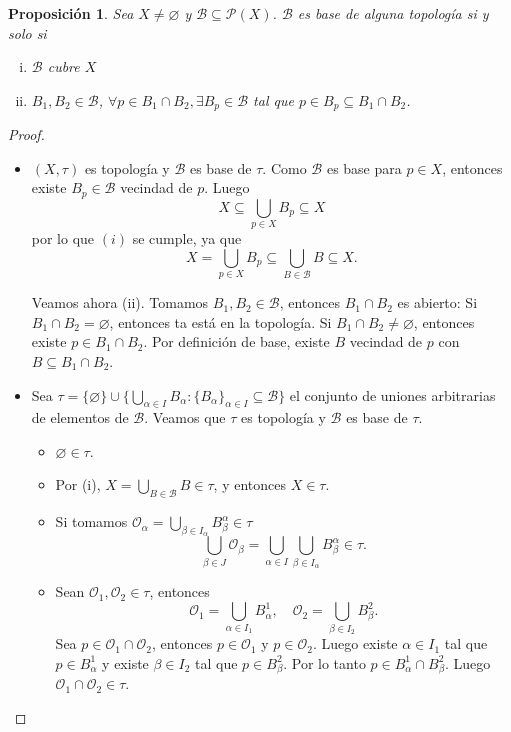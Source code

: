 \documentclass{article}
\newtheorem{proposition}[theorem]{Proposición}
\theoremstyle{definition}
\theoremstyle{remark}
\numberwithin{equation}{section}
\newcommand{\B}{\mathcal{B}}
\renewcommand{\O}{\mathcal{O}}
\renewcommand{\P}{\mathcal{P}}
\renewcommand{\a}{\alpha}
\renewcommand{\b}{\beta}
\renewcommand{\t}{\tau}
\begin{document}
\begin{proposition}
  Sea $X \neq \varnothing$ y $\B \subseteq \P(X)$.
  $\B$ es base de alguna topología si y solo si
  \begin{enumerate}[(i)]
    \item $\B$ cubre $X$
    \item $B_1,B_2 \in \B $, $\forall p \in B_1 \cap B_2, \exists B_p \in \B$ tal que $p \in B_p \subseteq B_1 \cap B_2$.
  \end{enumerate}
\end{proposition}
\begin{proof}
  \
  \begin{itemize}
    \item \boxed{\implies}
    $(X,\t)$ es topología y $\B$ es base de $\t$.
    Como $\B$ es base para $p \in X$, entonces existe $B_p \in \B$ vecindad de $p$. Luego
    \[X \subseteq \bigcup_{p \in X} B_p \subseteq X\]
    por lo que $(i)$ se cumple, ya que
    \[X = \bigcup_{p \in X} B_p \subseteq \bigcup_{B \in \B} B \subseteq X.\]

    Veamos ahora (ii). Tomamos $B_1,B_2 \in \B$, entonces $B_1 \cap B_2$ es abierto:
    Si $B_1 \cap B_2 = \varnothing$, entonces ta está en la topología.
    Si $B_1 \cap B_2 \neq \varnothing$, entonces existe $p \in B_1 \cap B_2$. Por definición de base, existe $B$ vecindad de $p$ con $B \subseteq B_1 \cap B_2$.

    \item \boxed{\impliedby}
    Sea $\t = \{\varnothing\} \cup \{\bigcup_{\a \in I} B_\a \colon \{B_\a\}_{\a \in I} \subseteq \B\}$ el conjunto de uniones arbitrarias de elementos de $\B$. Veamos que $\t$ es topología y $\B$ es base de $\t$.
    \begin{itemize}
      \item $\varnothing \in \t$.
      \item Por (i), $X = \bigcup_{B \in \B} B \in \t$, y entonces $X \in \t$.
      \item Si tomamos $\O_\a = \bigcup_{\beta \in I_\a} B_\beta^\a \in \t$
      \[\bigcup_{\beta \in J} \O_\beta = \bigcup_{\a \in I} \bigcup_{\beta \in I_\a} B_\beta^\a \in \t.\]
      \item Sean $\O_1, \O_2 \in \t$, entonces
      \[\O_1 = \bigcup_{\a \in I_1} B_\a^1, \quad
      \O_2 = \bigcup_{\beta \in I_2} B_\b^2.\]
      Sea $p \in \O_1 \cap \O_2$, entonces $p \in \O_1$ y $p \in \O_2$.
      Luego existe $\a \in I_1$ tal que $p \in B_\a^1$ y existe $\b \in I_2$ tal que $p \in B_\b^2$. Por lo tanto $p \in B_\a^1 \cap B_\b^2$.
      Luego $\O_1 \cap \O_2 \in \t$.
    \end{itemize}
  \end{itemize}
\end{proof}
\end{document}

